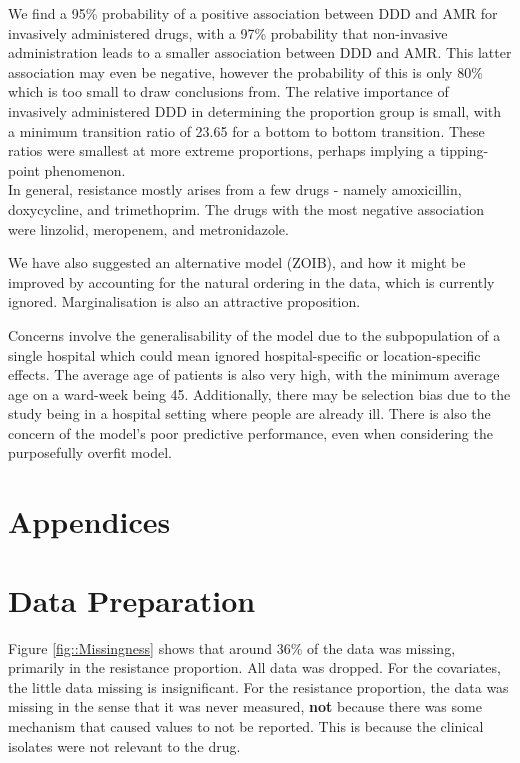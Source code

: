 \documentclass[11pt,twoside]{article}
\numberwithin{Theorem}{section}
\numberwithin{Definition}{section}
\numberwithin{Lemma}{section}
\numberwithin{Algorithm}{section}
\numberwithin{equation}{section}
\begin{document}
We find a 95\% probability of a positive association between DDD and AMR for invasively administered drugs, with a 97\% probability that non-invasive administration leads to a smaller association between DDD and AMR. This latter association may even be negative, however the probability of this is only 80\% which is too small to draw conclusions from. The relative importance of invasively administered DDD in determining the proportion group is small, with a minimum transition ratio of 23.65 for a bottom to bottom transition. These ratios were smallest at more extreme proportions, perhaps implying a tipping-point phenomenon.  \\

In general, resistance mostly arises from a few drugs - namely amoxicillin, doxycycline, and trimethoprim. The drugs with the most negative association were linzolid, meropenem, and metronidazole. 

We have also suggested an alternative model (ZOIB), and how it might be improved by accounting for the natural ordering in the data, which is currently ignored. Marginalisation is also an attractive proposition. 

Concerns involve the generalisability of the model due to the subpopulation of a single hospital which could mean ignored hospital-specific or location-specific effects. The average age of patients is also very high, with the minimum average age on a ward-week being 45. Additionally, there may be selection bias due to the study being in a hospital setting where people are already ill. There is also the concern of the model's poor predictive performance, even when considering the purposefully overfit model.  





\clearpage



\clearpage

\appendix
\section*{Appendices}

\section{Data Preparation}

Figure \ref{fig::Missingness} shows that around 36\% of the data was missing, primarily in the resistance proportion. All data was dropped. For the covariates, the little data missing is insignificant. For the resistance proportion, the data was missing in the sense that it was never measured, \textbf{not} because there was some mechanism that caused values to not be reported. This is because the clinical isolates were not relevant to the drug. 
\end{document}
